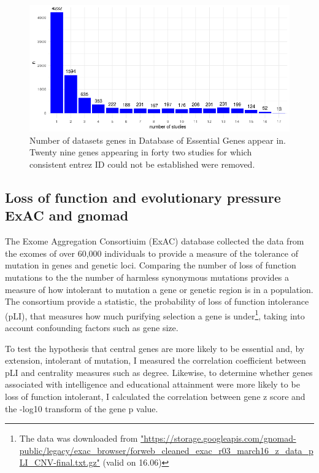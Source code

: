 \begin{figure}
    \centering
    \includegraphics[width=\textwidth]{images/chapter3/ggplot2/essential_genes/Rplot_num_studies_in_DEG_corrected.png}
    \caption{Number of datasets genes in Database of Essential Genes appear in. Twenty nine genes appearing in forty two studies for which consistent entrez ID could not be established were removed. }
    \label{fig:num_studies_database_essential_genes}
\end{figure}
\subsection{Loss of function and evolutionary pressure ExAC and gnomad}
\label{sec:methods exac and gnomad}
The Exome Aggregation Consortiuim (ExAC) database collected the data from the exomes of over 60,000 individuals to provide a measure of the tolerance of mutation in genes and genetic loci\cite{lek2016analysis}. Comparing the number of loss of function mutations to the the number of harmless synonymous mutations provides a measure of how intolerant to mutation a gene or genetic region is in a population. The consortium provide a statistic, the probability of loss of function intolerance (pLI), that measures how much purifying selection a gene is under\footnote{The data was downloaded from \url{"https://storage.googleapis.com/gnomad-public/legacy/exac_browser/forweb_cleaned_exac_r03_march16_z_data_pLI_CNV-final.txt.gz"} (valid on 16.06)}, taking into account confounding factors such as gene size. 

To test the hypothesis that central genes are more likely to be essential and, by extension, intolerant of mutation, I measured the correlation coefficient between pLI and centrality measures such as degree. Likewise, to determine whether genes associated with intelligence and educational attainment were more likely to be loss of function intolerant, I calculated the correlation between gene z score and the -log10 transform of the gene p value. 

